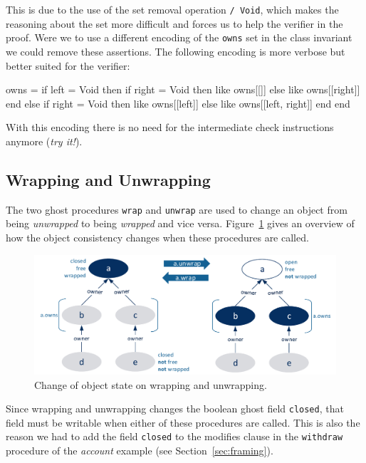 \documentclass[a4paper,12pt]{article}
\newcommand{\e}[1]{\mbox{\lstinline[language=Eiffel]|#1|}}
\begin{document}
This is due to the use of the set removal operation \e{/ Void}, which makes the reasoning about the set more difficult and forces us to help the verifier in the proof. Were we to use a different encoding of the \e{owns} set in the class invariant we could remove these assertions. The following encoding is more verbose but better suited for the verifier:
\begin{erunning}[basicstyle=\footnotesize]
owns =
	if left = Void then
		if right = Void then {like owns}[[]] else {like owns}[[right]] end
	else
		if right = Void then {like owns}[[left]] else {like owns}[[left, right]] end
	end
\end{erunning}
With this encoding there is no need for the intermediate check instructions anymore (\emph{try it!}).

\subsection{Wrapping and Unwrapping} \label{sec:wrapping}

The two ghost procedures \e{wrap} and \e{unwrap} are used to change an object from being \emph{unwrapped} to being \emph{wrapped} and vice versa. Figure~\ref{fig:wrapunwrap} gives an overview of how the object consistency changes when these procedures are called. 

\begin{figure}[!htb]
\begin{center}
\includegraphics[width=\columnwidth]{wrapunwrap.pdf}
\end{center}
\caption{Change of object state on wrapping and unwrapping.}
\label{fig:wrapunwrap}
\end{figure}

Since wrapping and unwrapping changes the boolean ghost field \e{closed}, that field must be writable when either of these procedures are called. This is also the reason we had to add the field \e{closed} to the modifies clause in the \e{withdraw} procedure of the \emph{account} example (see Section~\ref{sec:framing}).
\end{document}
